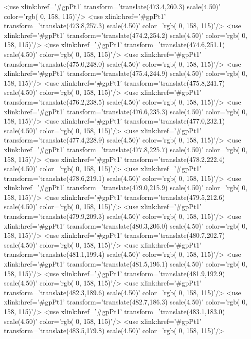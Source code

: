	<use xlink:href='#gpPt1' transform='translate(473.4,260.3) scale(4.50)' color='rgb(  0, 158, 115)'/>
	<use xlink:href='#gpPt1' transform='translate(473.8,257.3) scale(4.50)' color='rgb(  0, 158, 115)'/>
	<use xlink:href='#gpPt1' transform='translate(474.2,254.2) scale(4.50)' color='rgb(  0, 158, 115)'/>
	<use xlink:href='#gpPt1' transform='translate(474.6,251.1) scale(4.50)' color='rgb(  0, 158, 115)'/>
	<use xlink:href='#gpPt1' transform='translate(475.0,248.0) scale(4.50)' color='rgb(  0, 158, 115)'/>
	<use xlink:href='#gpPt1' transform='translate(475.4,244.9) scale(4.50)' color='rgb(  0, 158, 115)'/>
	<use xlink:href='#gpPt1' transform='translate(475.8,241.7) scale(4.50)' color='rgb(  0, 158, 115)'/>
	<use xlink:href='#gpPt1' transform='translate(476.2,238.5) scale(4.50)' color='rgb(  0, 158, 115)'/>
	<use xlink:href='#gpPt1' transform='translate(476.6,235.3) scale(4.50)' color='rgb(  0, 158, 115)'/>
	<use xlink:href='#gpPt1' transform='translate(477.0,232.1) scale(4.50)' color='rgb(  0, 158, 115)'/>
	<use xlink:href='#gpPt1' transform='translate(477.4,228.9) scale(4.50)' color='rgb(  0, 158, 115)'/>
	<use xlink:href='#gpPt1' transform='translate(477.8,225.7) scale(4.50)' color='rgb(  0, 158, 115)'/>
	<use xlink:href='#gpPt1' transform='translate(478.2,222.4) scale(4.50)' color='rgb(  0, 158, 115)'/>
	<use xlink:href='#gpPt1' transform='translate(478.6,219.1) scale(4.50)' color='rgb(  0, 158, 115)'/>
	<use xlink:href='#gpPt1' transform='translate(479.0,215.9) scale(4.50)' color='rgb(  0, 158, 115)'/>
	<use xlink:href='#gpPt1' transform='translate(479.5,212.6) scale(4.50)' color='rgb(  0, 158, 115)'/>
	<use xlink:href='#gpPt1' transform='translate(479.9,209.3) scale(4.50)' color='rgb(  0, 158, 115)'/>
	<use xlink:href='#gpPt1' transform='translate(480.3,206.0) scale(4.50)' color='rgb(  0, 158, 115)'/>
	<use xlink:href='#gpPt1' transform='translate(480.7,202.7) scale(4.50)' color='rgb(  0, 158, 115)'/>
	<use xlink:href='#gpPt1' transform='translate(481.1,199.4) scale(4.50)' color='rgb(  0, 158, 115)'/>
	<use xlink:href='#gpPt1' transform='translate(481.5,196.1) scale(4.50)' color='rgb(  0, 158, 115)'/>
	<use xlink:href='#gpPt1' transform='translate(481.9,192.9) scale(4.50)' color='rgb(  0, 158, 115)'/>
	<use xlink:href='#gpPt1' transform='translate(482.3,189.6) scale(4.50)' color='rgb(  0, 158, 115)'/>
	<use xlink:href='#gpPt1' transform='translate(482.7,186.3) scale(4.50)' color='rgb(  0, 158, 115)'/>
	<use xlink:href='#gpPt1' transform='translate(483.1,183.0) scale(4.50)' color='rgb(  0, 158, 115)'/>
	<use xlink:href='#gpPt1' transform='translate(483.5,179.8) scale(4.50)' color='rgb(  0, 158, 115)'/>
